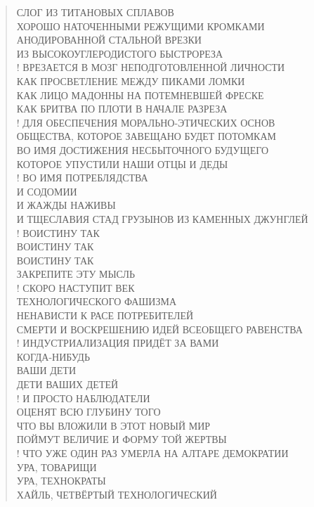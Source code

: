 \poemtitle{***}
\begin{verse}
СЛОГ ИЗ ТИТАНОВЫХ СПЛАВОВ\\
    ХОРОШО НАТОЧЕННЫМИ РЕЖУЩИМИ КРОМКАМИ\\
        АНОДИРОВАННОЙ СТАЛЬНОЙ ВРЕЗКИ\\
            ИЗ ВЫСОКОУГЛЕРОДИСТОГО БЫСТРОРЕЗА\\!
ВРЕЗАЕТСЯ В МОЗГ НЕПОДГОТОВЛЕННОЙ ЛИЧНОСТИ\\
    КАК ПРОСВЕТЛЕНИЕ МЕЖДУ ПИКАМИ ЛОМКИ\\
        КАК ЛИЦО МАДОННЫ НА ПОТЕМНЕВШЕЙ ФРЕСКЕ\\
            КАК БРИТВА ПО ПЛОТИ В НАЧАЛЕ РАЗРЕЗА\\!
ДЛЯ ОБЕСПЕЧЕНИЯ МОРАЛЬНО-ЭТИЧЕСКИХ ОСНОВ\\
    ОБЩЕСТВА, КОТОРОЕ ЗАВЕЩАНО БУДЕТ ПОТОМКАМ\\
        ВО ИМЯ ДОСТИЖЕНИЯ НЕСБЫТОЧНОГО БУДУЩЕГО\\
            КОТОРОЕ УПУСТИЛИ НАШИ ОТЦЫ И ДЕДЫ\\!
ВО ИМЯ ПОТРЕБЛЯДСТВА\\
    И СОДОМИИ\\
        И ЖАЖДЫ НАЖИВЫ\\
            И ТЩЕСЛАВИЯ СТАД ГРУЗЫНОВ ИЗ КАМЕННЫХ ДЖУНГЛЕЙ\\!
    ВОИСТИНУ ТАК\\
        ВОИСТИНУ ТАК\\
            ВОИСТИНУ ТАК\\
ЗАКРЕПИТЕ ЭТУ МЫСЛЬ\\!
    СКОРО НАСТУПИТ ВЕК \\
        ТЕХНОЛОГИЧЕСКОГО ФАШИЗМА\\
        НЕНАВИСТИ К РАСЕ ПОТРЕБИТЕЛЕЙ\\
        СМЕРТИ И ВОСКРЕШЕНИЮ ИДЕЙ ВСЕОБЩЕГО РАВЕНСТВА\\!
    ИНДУСТРИАЛИЗАЦИЯ ПРИДЁТ ЗА ВАМИ\\
    КОГДА-НИБУДЬ\\
        ВАШИ ДЕТИ\\
        ДЕТИ ВАШИХ ДЕТЕЙ\\!
        И ПРОСТО НАБЛЮДАТЕЛИ\\
    ОЦЕНЯТ ВСЮ ГЛУБИНУ ТОГО\\
        ЧТО ВЫ ВЛОЖИЛИ В ЭТОТ НОВЫЙ МИР\\
    ПОЙМУТ ВЕЛИЧИЕ И ФОРМУ ТОЙ ЖЕРТВЫ\\!
        ЧТО УЖЕ ОДИН РАЗ УМЕРЛА НА АЛТАРЕ ДЕМОКРАТИИ\\
УРА, ТОВАРИЩИ\\
УРА, ТЕХНОКРАТЫ\\
ХАЙЛЬ, ЧЕТВЁРТЫЙ ТЕХНОЛОГИЧЕСКИЙ
\end{verse}

